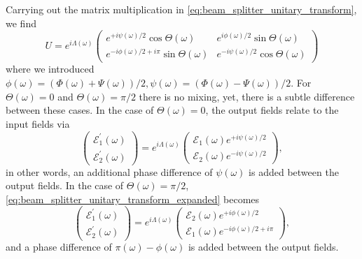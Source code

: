 Carrying out the matrix multiplication in \cref{eq:beam_splitter_unitary_transform}, we find
\begin{equation}
	U
	=
    e^{i\Lambda(\omega)}
    \begin{pmatrix}
        e^{+i\psi(\omega)/2}\cos\Theta(\omega) & e^{i\phi(\omega)/2}\sin\Theta(\omega)
        \\
        e^{-i\phi(\omega)/2+i\pi}\sin\Theta(\omega) & e^{-i\psi(\omega)/2}\cos\Theta(\omega)
    \end{pmatrix}
    \label{eq:beam_splitter_unitary_transform_expanded}
\end{equation}
where we introduced $\phi(\omega)=(\Phi(\omega)+\Psi(\omega))/2,\psi(\omega)=(\Phi(\omega)-\Psi(\omega))/2$.
For $\Theta(\omega)=0$ and $\Theta(\omega)=\pi/2$ there is no mixing, yet, there is a subtle difference between these cases.
In the case of $\Theta(\omega)=0$, the output fields relate to the input fields via
\begin{equation}
    \begin{pmatrix}
        \mathcal{E}_1^\prime(\omega)
        \\
        \mathcal{E}_2^\prime(\omega)
    \end{pmatrix}
    =
    e^{i\Lambda(\omega)}
    \begin{pmatrix}
        \mathcal{E}_1(\omega)e^{+i\psi(\omega)/2}
        \\
        \mathcal{E}_2(\omega)e^{-i\psi(\omega)/2}
    \end{pmatrix}
    \label{eq:beam_splitter_unitary_transform_transmission},
\end{equation}
in other words, an additional phase difference of $\psi(\omega)$ is added between the output fields.
In the case of $\Theta(\omega)=\pi/2$, \cref{eq:beam_splitter_unitary_transform_expanded} becomes
\begin{equation}
    \begin{pmatrix}
        \mathcal{E}_1^\prime(\omega)
        \\
        \mathcal{E}_2^\prime(\omega)
	\end{pmatrix}
    =
    e^{i\Lambda(\omega)}
    \begin{pmatrix}
        \mathcal{E}_2(\omega)e^{+i\phi(\omega)/2}
        \\
        \mathcal{E}_1(\omega)e^{-i\phi(\omega)/2+i\pi}
    \end{pmatrix}
    \label{eq:beam_splitter_unitary_transform_reflection},
\end{equation}
and a phase difference of $\pi(\omega)-\phi(\omega)$ is added between the output fields.
